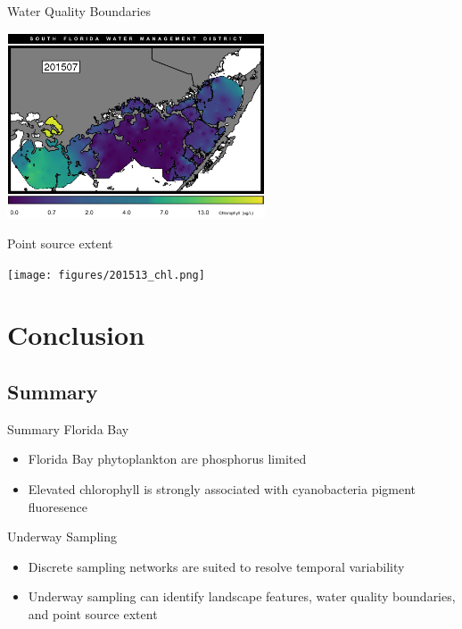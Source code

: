 \documentclass[compress,noflama,nosectionpages]{beamer}
\begin{document}
		\begin{frame}{Water Quality Boundaries}
			\begin{center}
				\includegraphics[height=5.5cm,keepaspectratio=true,trim= 1mm 0mm 1mm 10mm,clip=TRUE]{figures/201507_chl.png}\\
			\end{center}
		\end{frame}
		
		\begin{frame}{Point source extent}
			\begin{center}
				\texttt{[image: figures/201513\_chl.png]}\\
			\end{center}
		\end{frame}
		

\section{Conclusion}
\subsection{Summary}

\begin{frame}{Summary}
\large
Florida Bay
\begin{itemize}
\item{Florida Bay phytoplankton are phosphorus limited}
\vspace{6pt}
\item{Elevated chlorophyll is strongly associated with cyanobacteria pigment fluoresence}
\end{itemize}

Underway Sampling
\begin{itemize}
\item{Discrete sampling networks are suited to resolve temporal variability}
\vspace{6pt}
\item{Underway sampling can identify landscape features, water quality boundaries, and point source extent}
\end{itemize}

\end{frame}
\end{document}

